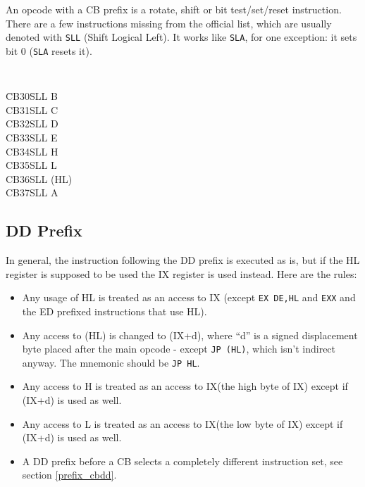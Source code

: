 \documentclass[12pt,twoside,openright,a4paper]{book}
\begin{document}
An opcode with a CB prefix is a rotate, shift or bit test/set/reset instruction. There are a few instructions missing from the official list, which are usually denoted with {\tt SLL} (Shift Logical Left). It works like {\tt SLA}, for one exception: it sets bit 0 ({\tt SLA} resets it).

{\tt 
  \begin{tabbing}
    {\qquad}\=CB30\qquad\=SLL B \+\\
       CB31\>SLL C\\
       CB32\>SLL D\\
       CB33\>SLL E\\
       CB34\>SLL H\\
       CB35\>SLL L\\
       CB36\>SLL (HL)\\
       CB37\>SLL A
	\end{tabbing}
}


\subsection{DD Prefix \cite{gerton}}

In general, the instruction following the DD prefix is executed as is, but if the HL register is supposed to be used the IX register is used instead. Here are the rules:

\begin{itemize}[topsep=1pt,itemsep=1pt]
	\item Any usage of HL is treated as an access to IX (except {\tt EX DE,HL} and {\tt EXX} and the ED prefixed instructions that use HL).
	
	\item Any access to (HL) is changed to (IX+d), where ``d'' is a signed displacement byte placed after the main opcode - except {\tt JP (HL)}, which isn't indirect anyway. The mnemonic should be {\tt JP HL}.
	
	\item Any access to H is treated as an access to IX\High (the high byte of IX) except if (IX+d) is used as well.
	
	\item Any access to L is treated as an access to IX\Low (the low byte of IX) except if (IX+d) is used as well.
	
	\item A DD prefix before a CB selects a completely different instruction set, see section {\ref{prefix_cbdd}}.
\end{itemize}
\end{document}
